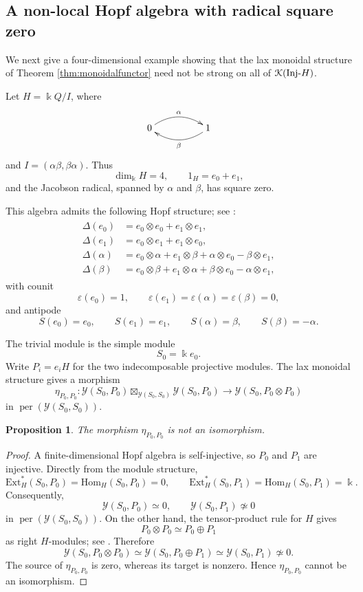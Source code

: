 \documentclass[a4paper, 11pt]{amsart}
\newtheorem{prop}[thm]{Proposition}
\theoremstyle{definition}
\theoremstyle{remark}
\numberwithin{equation}{section}
\newcommand{\Ext}{\mathrm{Ext}}
\newcommand{\Y}{\mathcal{Y}}
\newcommand{\Hom}{\mathrm{Hom}}
\newcommand{\EK}{\EuScript{K}}
\begin{document}
\subsection{A non-local Hopf algebra with radical square zero}\label{subsec:radicalsquarezero}
We next give a four-dimensional example showing that the lax monoidal structure of Theorem \ref{thm:monoidalfunctor} need not be strong on all of $\EK(\mathrm{Inj}\text{-}H)$.

Let $H=\Bbbk Q/I$, where
\[
\xymatrix@C=5em@R=5em{
0 \ar@/^1pc/[r]^{\alpha}& 1 \ar@/^1pc/[l]^{\beta}
}
\]
and $I=(\alpha\beta,\beta\alpha)$. Thus
\[
\dim_\Bbbk H=4,
\qquad
1_H=e_0+e_1,
\]
and the Jacobson radical, spanned by $\alpha$ and $\beta$, has square zero.

This algebra admits the following Hopf structure; see \cite[Section 4]{YL}:
\begin{align}\label{algin:coprdocutradical}
\begin{aligned}
\Delta(e_0)&=e_0\otimes e_0+e_1\otimes e_1,\\
\Delta(e_1)&=e_0\otimes e_1+e_1\otimes e_0,\\
\Delta(\alpha)&=e_0\otimes\alpha+e_1\otimes\beta+\alpha\otimes e_0-\beta\otimes e_1,\\
\Delta(\beta)&=e_0\otimes\beta+e_1\otimes\alpha+\beta\otimes e_0-\alpha\otimes e_1,
\end{aligned}
\end{align}
with counit
\[
\varepsilon(e_0)=1,
\qquad
\varepsilon(e_1)=\varepsilon(\alpha)=\varepsilon(\beta)=0,
\]
and antipode
\[
S(e_0)=e_0,\qquad
S(e_1)=e_1,\qquad
S(\alpha)=\beta,\qquad
S(\beta)=-\alpha.
\]

The trivial module is the simple module
\[
S_0=\Bbbk e_0.
\]
Write $P_i=e_iH$ for the two indecomposable projective modules. The lax monoidal structure gives a morphism
\[
\eta_{P_0,P_0}\colon
\Y(S_0,P_0)\boxtimes_{\Y(S_0,S_0)}\Y(S_0,P_0)
\longrightarrow
\Y(S_0,P_0\otimes P_0)
\]
in $\operatorname{per}(\Y(S_0,S_0))$.

\begin{prop}\label{prop:laxmonoidal}
The morphism $\eta_{P_0,P_0}$ is not an isomorphism.
\end{prop}
\begin{proof}
A finite-dimensional Hopf algebra is self-injective, so $P_0$ and $P_1$ are injective. Directly from the module structure,
\[
\Ext_H^*(S_0,P_0)=\Hom_H(S_0,P_0)=0,
\qquad
\Ext_H^*(S_0,P_1)=\Hom_H(S_0,P_1)=\Bbbk.
\]
Consequently,
\[
\Y(S_0,P_0)\simeq0,
\qquad
\Y(S_0,P_1)\not\simeq0
\]
in $\operatorname{per}(\Y(S_0,S_0))$. On the other hand, the tensor-product rule for $H$ gives
\[
P_0\otimes P_0\simeq P_0\oplus P_1
\]
as right $H$-modules; see \cite[Section 4]{YL}. Therefore
\[
\Y(S_0,P_0\otimes P_0)
 \simeq\Y(S_0,P_0\oplus P_1)
 \simeq\Y(S_0,P_1)
 \not\simeq0.
\]
The source of $\eta_{P_0,P_0}$ is zero, whereas its target is nonzero. Hence $\eta_{P_0,P_0}$ cannot be an isomorphism.
\end{proof}
\end{document}
